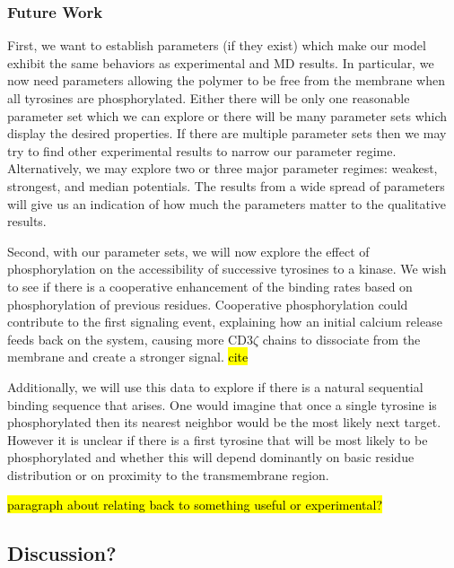 \documentclass[../../AdvancementSummary.tex]{subfiles}
\begin{document}
\subsubsection{Future Work}

First, we want to establish parameters (if they exist) which make our model exhibit the same behaviors as experimental and MD results. In particular, we now need parameters allowing the polymer to be free from the membrane when all tyrosines are phosphorylated. Either there will be only one reasonable parameter set which we can explore or there will be many parameter sets which display the desired properties.  If there are multiple parameter sets then we may try to find other experimental results to narrow our parameter regime. Alternatively, we may explore two or three major parameter regimes: weakest, strongest, and median potentials. The results from a wide spread of parameters will give us an indication of how much the parameters matter to the qualitative results.  

Second, with our parameter sets, we will now explore the effect of phosphorylation on the accessibility of successive tyrosines to a kinase.  We wish to see if there is a cooperative enhancement of the binding rates based on phosphorylation of previous residues.  Cooperative phosphorylation could contribute to the first signaling event, explaining how an initial calcium release feeds back on the system, causing more CD3$\zeta$ chains to dissociate from the membrane and create a stronger signal. \hl{cite}

Additionally, we will use this data to explore if there is a natural sequential binding sequence that arises.  One would imagine that once a single tyrosine is phosphorylated then its nearest neighbor would be the most likely next target.  However it is unclear if there is a first tyrosine that will be most likely to be phosphorylated and whether this will depend dominantly on basic residue distribution or on proximity to the transmembrane region. 

\hl{paragraph about relating back to something useful or experimental?}



\subsection{Discussion?}
\end{document}
